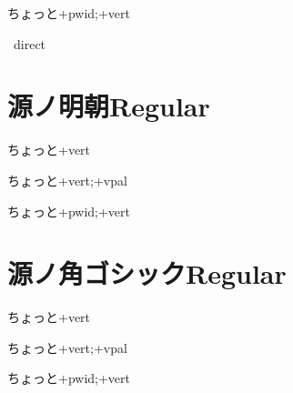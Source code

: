 \documentclass[tate,paper={297mm,210mm}]{jlreq}
\begin{document}
\hgrpwidvert\hbox{\tate\vrule ちょっと\vrule +pwid;+vert}

\hgrnone\hbox{\tate\vrule%
  \vrule direct}

\section*{源ノ明朝Regular}

\sernone\hbox{\tate\vrule ちょっと\vrule +vert}

\servpal\hbox{\tate\vrule ちょっと\vrule +vert;+vpal}

\serpwidvert\hbox{\tate\vrule ちょっと\vrule +pwid;+vert}

\section*{源ノ角ゴシックRegular}

\sarnone\hbox{\tate\vrule ちょっと\vrule +vert}

\sarvpal\hbox{\tate\vrule ちょっと\vrule +vert;+vpal}

\sarpwidvert\hbox{\tate\vrule ちょっと\vrule +pwid;+vert}
\end{document}
